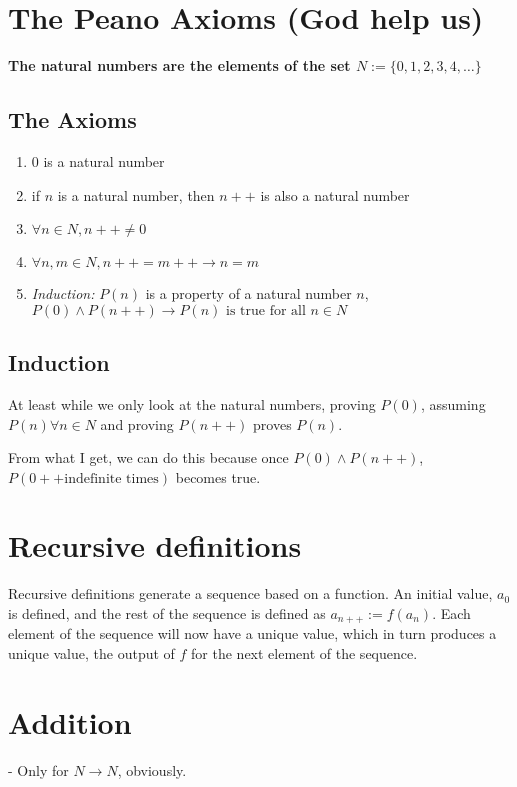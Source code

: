 \documentclass[letterpaper]{article}
\title{\vspace{-3.0cm}\T}
\date{\vspace{-1cm}\D \ / \M  \ / \Y}
\begin{document}
\maketitle

\section*{The Peano Axioms (God help us)}
\textbf{The natural numbers are the elements of the set $N := \{0,1,2,3,4,\dots\}$}

\subsection*{The Axioms}
\begin{enumerate}
	\item 0 is a natural number
	\item if $n$ is a natural number, then $n++$ is also a natural number
	\item $\forall n \in N, n++ \neq 0$
	\item $\forall n,m \in N, n++ = m++ \to n=m$
	\item \emph{Induction:} $P(n)$ is a property of a natural number $n$, $P(0) \land P(n++) \to P(n) \text{ is true for all } n \in N$
\end{enumerate}

\subsection*{Induction}
At least while we only look at the natural numbers, proving $P(0)$, assuming $P(n) \forall n\in N$ and proving $P(n++)$ proves $P(n)$.

From what I get, we can do this because once $P(0) \land P(n++)$, $P(0 ++ \text{indefinite times})$ becomes true.

\section*{Recursive definitions}
Recursive definitions generate a sequence based on a function. An initial value, $a_0$ is defined, and the rest of the sequence is defined as $a_{n++} := f(a_{n})$. Each element of the sequence will now have a unique value, which in turn produces a unique value, the output of $f$ for the next element of the sequence.

\section*{Addition}
- Only for $N \to N$, obviously.
\end{document}
